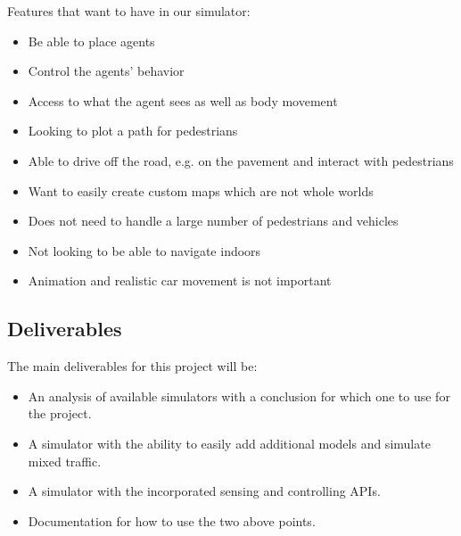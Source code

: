 
Features that want to have in our simulator: 
\begin{itemize}
\item Be able to place agents
\item Control the agents' behavior
\item Access to what the agent sees as well as body movement
\item Looking to plot a path for pedestrians
\item Able to drive off the road, e.g. on the pavement and interact with pedestrians
\item Want to easily create custom maps which are not whole worlds
\item Does not need to handle a large number of pedestrians and vehicles
\item Not looking to be able to navigate indoors
\item Animation and realistic car movement is not important
\end{itemize}

\subsection{Deliverables}
The main deliverables for this project will be:
\begin{itemize}
    \item An analysis of available simulators with a conclusion for which one to use for the project.
    \item A simulator with the ability to easily add additional models and simulate mixed traffic.
    \item A simulator with the incorporated sensing and controlling APIs.
    \item Documentation for how to use the two above points.
\end{itemize}



